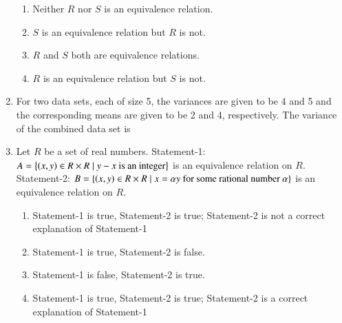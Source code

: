 \documentclass[journal,12pt,twocolumn]{IEEEtran}
\theoremstyle{remark}
\begin{document}
\begin{enumerate}
    \hfill{}
    \begin{enumerate}
        \item Neither $R$ nor $S$ is an equivalence relation.
        \item $S$ is an equivalence relation but $R$ is not.
        \item $R$ and $S$ both are equivalence relations.
        \item $R$ is an equivalence relation but $S$ is not.
    \end{enumerate}
    
    \item For two data sets, each of size 5, the variances are given to be 4 and 5 and the corresponding means are given to be 2 and 4, respectively. The variance of the combined data set is
    
    \hfill{}
    \begin{enumerate}
    \end{enumerate}
    
    \item Let $R$ be a set of real numbers. \newline
    Statement-1: $A = \left\{\left(x, y\right) \in R \times R \mid y - x \text{ is an integer}\right\}$ is an equivalence relation on $R$. \newline
    Statement-2: $B = \left\{\left(x, y\right) \in R \times R \mid x = \alpha y \text{ for some rational number } \alpha \right\}$ is an equivalence relation on $R$.

    \hfill{}
    \begin{enumerate}
        \item Statement-1 is true, Statement-2 is true; Statement-2 is not a correct explanation of Statement-1
        \item Statement-1 is true, Statement-2 is false.
        \item Statement-1 is false, Statement-2 is true.
        \item Statement-1 is true, Statement-2 is true; Statement-2 is a correct explanation of Statement-1
    \end{enumerate}
    

\end{enumerate}
\end{document}
